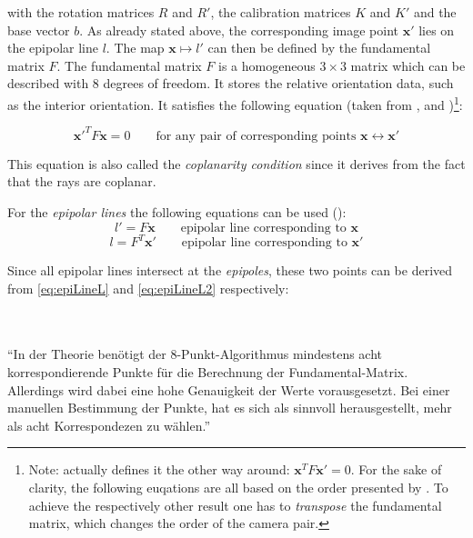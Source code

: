 with the rotation matrices $R$ and $R'$, the calibration matrices $K$ and $K'$ and the base vector $b$. As already stated above, the corresponding image point $\mathbf{x'}$ lies on the epipolar line $l$. The map $\mathbf{x}\mapsto l'$ can then be defined by the fundamental matrix $F$. The fundamental matrix $F$ is a  homogeneous $3\times 3$ matrix which can be described with 8 degrees of freedom. It stores the relative orientation data, such as the interior orientation. It satisfies the following equation (taken from \cite[p.245 et seq.]{Hartley.2011}, \cite[p.2]{Loop.2001} and \cite[p.310]{Luhmann.2014})\footnote{Note: \cite{Luhmann.2014} actually defines it the other way around: $\mathbf{x}^T F \mathbf{x'} =0$. For the sake of clarity, the following euqations are all based on the order presented by \cite{Hartley.2011}. To achieve the respectively other  result one has to \textit{transpose} the fundamental matrix, which changes the order of the camera pair.}: 

\begin{equation}
 \mathbf{x'}^T F \mathbf{x}=0
 \qquad
\text{for any pair of corresponding points } \mathbf{x}\leftrightarrow \mathbf{x'}\label{eq:CoplanarityCondition} 
\end{equation}
 
This equation is also called the \textit{coplanarity condition} since it derives from the fact that the rays are coplanar.

For the \textit{epipolar lines} the following equations can be used (\cite[p.246]{Hartley.2011}):
\begin{equation}
 l' = F\mathbf{x}
 \qquad
\text{epipolar line corresponding to } \mathbf{x}\label{eq:epiLineL2}
\end{equation}
\begin{equation}
 l = F^T\mathbf{x'}
 \qquad
\text{epipolar line corresponding to } \mathbf{x'}\label{eq:epiLineL}
\end{equation}

Since all epipolar lines intersect at the \textit{epipoles}, these two points can be derived from \autoref{eq:epiLineL} and \autoref{eq:epiLineL2} respectively:

\\
\\
\enquote{In der Theorie benötigt der 8-Punkt-Algorithmus mindestens acht korrespondierende Punkte für die Berechnung der Fundamental-Matrix. Allerdings wird dabei eine hohe Genauigkeit der Werte vorausgesetzt. Bei einer manuellen Bestimmung der Punkte, hat es sich als sinnvoll herausgestellt, mehr als acht Korrespondezen zu wählen.}


